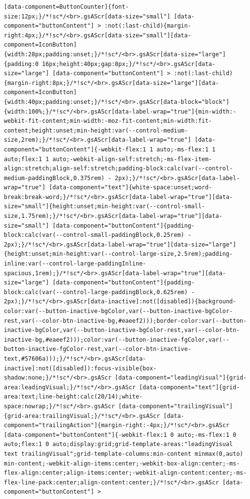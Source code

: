 \documentclass[
  letterpaper,
]{book}
\begin{document}
\begin{verbatim}
[data-component=ButtonCounter]{font-size:12px;}/*!sc*/<br>.gsAScr[data-size="small"] [data-component="buttonContent"] > :not(:last-child){margin-right:4px;}/*!sc*/<br>.gsAScr[data-size="small"][data-component=IconButton]{width:28px;padding:unset;}/*!sc*/<br>.gsAScr[data-size="large"]{padding:0 16px;height:40px;gap:8px;}/*!sc*/<br>.gsAScr[data-size="large"] [data-component="buttonContent"] > :not(:last-child){margin-right:8px;}/*!sc*/<br>.gsAScr[data-size="large"][data-component=IconButton]{width:40px;padding:unset;}/*!sc*/<br>.gsAScr[data-block="block"]{width:100%;}/*!sc*/<br>.gsAScr[data-label-wrap="true"]{min-width:-webkit-fit-content;min-width:-moz-fit-content;min-width:fit-content;height:unset;min-height:var(--control-medium-size,2rem);}/*!sc*/<br>.gsAScr[data-label-wrap="true"] [data-component="buttonContent"]{-webkit-flex:1 1 auto;-ms-flex:1 1 auto;flex:1 1 auto;-webkit-align-self:stretch;-ms-flex-item-align:stretch;align-self:stretch;padding-block:calc(var(--control-medium-paddingBlock,0.375rem) - 2px);}/*!sc*/<br>.gsAScr[data-label-wrap="true"] [data-component="text"]{white-space:unset;word-break:break-word;}/*!sc*/<br>.gsAScr[data-label-wrap="true"][data-size="small"]{height:unset;min-height:var(--control-small-size,1.75rem);}/*!sc*/<br>.gsAScr[data-label-wrap="true"][data-size="small"] [data-component="buttonContent"]{padding-block:calc(var(--control-small-paddingBlock,0.25rem) - 2px);}/*!sc*/<br>.gsAScr[data-label-wrap="true"][data-size="large"]{height:unset;min-height:var(--control-large-size,2.5rem);padding-inline:var(--control-large-paddingInline-spacious,1rem);}/*!sc*/<br>.gsAScr[data-label-wrap="true"][data-size="large"] [data-component="buttonContent"]{padding-block:calc(var(--control-large-paddingBlock,0.625rem) - 2px);}/*!sc*/<br>.gsAScr[data-inactive]:not([disabled]){background-color:var(--button-inactive-bgColor,var(--button-inactive-bgColor-rest,var(--color-btn-inactive-bg,#eaeef2)));border-color:var(--button-inactive-bgColor,var(--button-inactive-bgColor-rest,var(--color-btn-inactive-bg,#eaeef2)));color:var(--button-inactive-fgColor,var(--button-inactive-fgColor-rest,var(--color-btn-inactive-text,#57606a)));}/*!sc*/<br>.gsAScr[data-inactive]:not([disabled]):focus-visible{box-shadow:none;}/*!sc*/<br>.gsAScr [data-component="leadingVisual"]{grid-area:leadingVisual;}/*!sc*/<br>.gsAScr [data-component="text"]{grid-area:text;line-height:calc(20/14);white-space:nowrap;}/*!sc*/<br>.gsAScr [data-component="trailingVisual"]{grid-area:trailingVisual;}/*!sc*/<br>.gsAScr [data-component="trailingAction"]{margin-right:-4px;}/*!sc*/<br>.gsAScr [data-component="buttonContent"]{-webkit-flex:1 0 auto;-ms-flex:1 0 auto;flex:1 0 auto;display:grid;grid-template-areas:"leadingVisual text trailingVisual";grid-template-columns:min-content minmax(0,auto) min-content;-webkit-align-items:center;-webkit-box-align:center;-ms-flex-align:center;align-items:center;-webkit-align-content:center;-ms-flex-line-pack:center;align-content:center;}/*!sc*/<br>.gsAScr [data-component="buttonContent"] > 
\end{verbatim}
\end{document}
